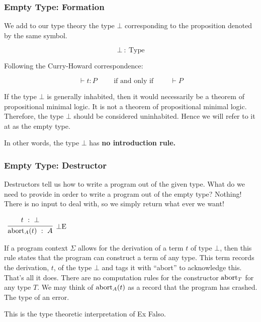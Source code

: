 \documentclass{beamer}
\theoremstyle{indentDefn} \newtheorem{defn}[]{Definition}
\begin{document}
\begin{frame}
  \frametitle{Empty Type: Formation}

  We add to our type theory the type $\bot$ corresponding to the proposition denoted by the same symbol. 
  
  $$ \bot \ : \ \text{Type} $$

  Following the Curry-Howard correspondence:
  
  $$ \vdash t : P \hspace{1cm} \text{if and only if} \hspace{1cm} \vdash P$$
  
  If the type $\bot$ is generally inhabited, then it would necessarily be a theorem of propositional minimal logic. It is not a theorem of propositional minimal logic. Therefore, the type $\bot$ should be considered uninhabited. Hence we will refer to it at as the empty type.

  In other words, the type $\bot$ has {\bf no introduction rule.} 

\end{frame}

\begin{frame}
  \frametitle{Empty Type: Destructor}

  Destructors tell us how to write a program out of the given type. What do we need to provide in order to write a program out of the empty type? Nothing! There is no input to deal with, so we simply return what ever we want!

  \begin{center}		
		$\begin{array}{c}		
		\infer[\bot \text{E}]{\abort_{A}(t) \ : \ A}
		{\begin{array}{c} t \ : \ \bot \end{array}}
		\end{array}$
	\end{center}

  If a program context $\Sigma$ allows for the derivation of a term $t$ of type $\bot$, then this rule states that the program can construct a term of any type. This term records the derivation, $t$, of the type $\bot$ and tags it with ``abort'' to acknowledge this. That's all it does. There are no computation rules for the constructor $\text{abort}_{T}$ for any type $T$. We may think of $\text{abort}_{A}(t)$ as a record that the program has crashed. The type of an error. 
    
  This is the type theoretic interpretation of Ex Falso. 

\end{frame}
\end{document}
